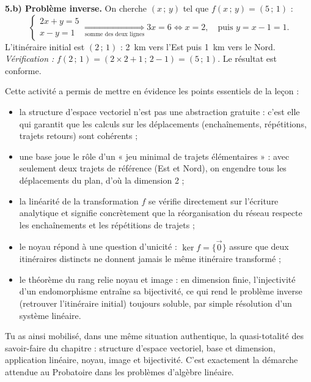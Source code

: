 \documentclass[11pt]{article}
\newcommand{\cle}[1]{{\popxbold\color{popdark}#1}}
\newcounter{popsec}
\newcounter{popsub}
\newcommand{\courssub}[1]{%
  \stepcounter{popsub}%
  \par\vspace{9pt}\noindent{\popxbold\fontsize{11.5}{13}\selectfont\color{popink}{\color{poporange}\thepopsec.\thepopsub}\hspace{6pt}#1}\par\nopagebreak\vspace{4pt}
}
\begin{document}
\begin{exoresolu}
\textbf{5.b) Problème inverse.} On cherche $(x\,;\,y)$ tel que $f(x\,;\,y)=(5\,;\,1)$ :
\[
\begin{cases} 2x+y=5 \\ x-y=1 \end{cases}
\underset{\text{somme des deux lignes}}{\Longrightarrow} 3x=6 \iff x=2, \quad \text{puis } y=x-1=1.
\]
L'itinéraire initial est $(2\,;\,1)$ : \SI{2}{km} vers l'Est puis \SI{1}{km} vers le Nord. \emph{Vérification :} $f(2\,;\,1)=(2\times 2+1\,;\,2-1)=(5\,;\,1)$. Le résultat est conforme.
\end{exoresolu}

\courssub{Bilan de l'activité}

Cette activité a permis de mettre en évidence les points essentiels de la leçon :
\begin{itemize}
\item la structure d'\cle{espace vectoriel} n'est pas une abstraction gratuite : c'est elle qui garantit que les calculs sur les déplacements (enchaînements, répétitions, trajets retours) sont cohérents ;
\item une \cle{base} joue le rôle d'un « jeu minimal de trajets élémentaires » : avec seulement deux trajets de référence (Est et Nord), on engendre tous les déplacements du plan, d'où la \cle{dimension} 2 ;
\item la \cle{linéarité} de la transformation $f$ se vérifie directement sur l'écriture analytique et signifie concrètement que la réorganisation du réseau respecte les enchaînements et les répétitions de trajets ;
\item le \cle{noyau} répond à une question d'unicité : $\ker f=\{\vec{0}\}$ assure que deux itinéraires distincts ne donnent jamais le même itinéraire transformé ;
\item le théorème du rang relie noyau et \cle{image} : en dimension finie, l'injectivité d'un endomorphisme entraîne sa bijectivité, ce qui rend le problème inverse (retrouver l'itinéraire initial) toujours soluble, par simple résolution d'un système linéaire.
\end{itemize}
Tu as ainsi mobilisé, dans une même situation authentique, la quasi-totalité des savoir-faire du chapitre : structure d'espace vectoriel, base et dimension, application linéaire, noyau, image et bijectivité. C'est exactement la démarche attendue au Probatoire dans les problèmes d'algèbre linéaire.
\end{document}
